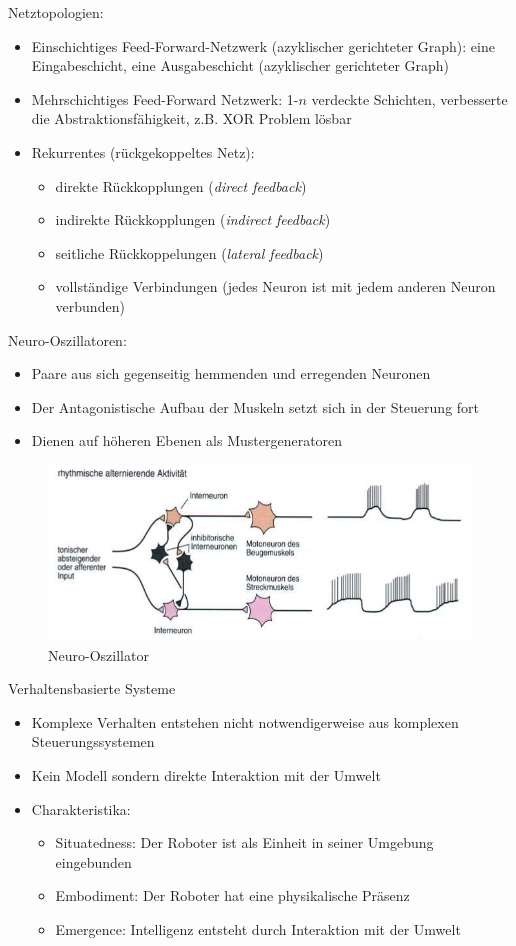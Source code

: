 Netztopologien:
\begin{itemize}
\item Einschichtiges Feed-Forward-Netzwerk (azyklischer gerichteter Graph): eine Eingabeschicht, eine Ausgabeschicht (azyklischer gerichteter Graph)
\item Mehrschichtiges Feed-Forward Netzwerk: 1-$n$ verdeckte Schichten, verbesserte die Abstraktionsfähigkeit, z.B. XOR Problem lösbar
\item Rekurrentes (rückgekoppeltes Netz):
\begin{itemize}
\item direkte Rückkopplungen (\textit{direct feedback})
\item indirekte Rückkopplungen (\textit{indirect feedback})
\item seitliche Rückkoppelungen (\textit{lateral feedback})
\item vollständige Verbindungen (jedes Neuron ist mit jedem anderen Neuron verbunden)
\end{itemize}
\end{itemize}
Neuro-Oszillatoren:
\begin{itemize}
\item Paare aus sich gegenseitig hemmenden und erregenden Neuronen
\item Der Antagonistische Aufbau der Muskeln setzt sich in der Steuerung fort
\item Dienen auf höheren Ebenen als Mustergeneratoren
\end{itemize}
\begin{figure}[h!]
	\centering
	\includegraphics[width=\textwidth]{figures/ch05_NeuroOs.png}
	\caption{Neuro-Oszillator}
\end{figure}
Verhaltensbasierte Systeme
\begin{itemize}
\item Komplexe Verhalten entstehen nicht notwendigerweise aus komplexen Steuerungssystemen
\item Kein Modell sondern direkte Interaktion mit der Umwelt
\item Charakteristika:
\begin{itemize}
\item Situatedness: Der Roboter ist als Einheit in seiner Umgebung eingebunden
\item Embodiment: Der Roboter hat eine physikalische Präsenz
\item Emergence: Intelligenz entsteht durch Interaktion mit der Umwelt
\end{itemize}
\end{itemize}
